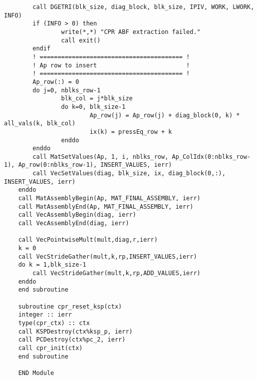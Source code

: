\begin{lstlisting}
        call DGETRI(blk_size, diag_block, blk_size, IPIV, WORK, LWORK, INFO)
        if (INFO > 0) then
                write(*,*) "CPR ABF extraction failed."
                call exit()
        endif
        ! ======================================== !
        ! Ap row to insert                         !
        ! ======================================== !
        Ap_row(:) = 0
        do j=0, nblks_row-1
                blk_col = j*blk_size
                do k=0, blk_size-1
                        Ap_row(j) = Ap_row(j) + diag_block(0, k) * all_vals(k, blk_col)
                        ix(k) = pressEq_row + k
                enddo
        enddo
        call MatSetValues(Ap, 1, i, nblks_row, Ap_ColIdx(0:nblks_row-1), Ap_row(0:nblks_row-1), INSERT_VALUES, ierr)
        call VecSetValues(diag, blk_size, ix, diag_block(0,:), INSERT_VALUES, ierr)
    enddo
    call MatAssemblyBegin(Ap, MAT_FINAL_ASSEMBLY, ierr)
    call MatAssemblyEnd(Ap, MAT_FINAL_ASSEMBLY, ierr)
    call VecAssemblyBegin(diag, ierr)
    call VecAssemblyEnd(diag, ierr)

    call VecPointwiseMult(mult,diag,r,ierr)
    k = 0
    call VecStrideGather(mult,k,rp,INSERT_VALUES,ierr)
    do k = 1,blk_size-1
        call VecStrideGather(mult,k,rp,ADD_VALUES,ierr)
    enddo
    end subroutine

    subroutine cpr_reset_ksp(ctx)
    integer :: ierr
    type(cpr_ctx) :: ctx
    call KSPDestroy(ctx%ksp_p, ierr)
    call PCDestroy(ctx%pc_2, ierr)
    call cpr_init(ctx)
    end subroutine

    END Module
\end{lstlisting}
